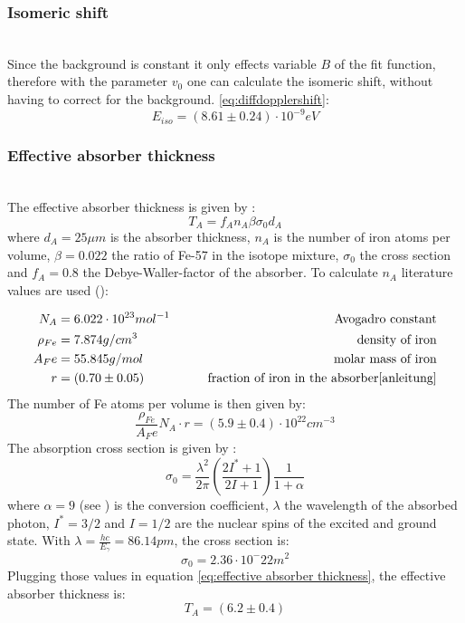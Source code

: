 \subsubsection{Isomeric shift} \ \\
Since the background is constant it only effects variable $B$ of the fit function, therefore
with the parameter $v_0$ one can calculate the isomeric shift, without having to correct for the background. \ref{eq:diffdopplershift}:
\begin{equation}
E_{iso} = (8.61\pm0.24)\cdot 10^{-9} eV
\end{equation}
\subsubsection{Effective absorber thickness}
\label{sec:effab}
 \ \\
The effective absorber thickness is given by \cite{anleitung}:
\begin{equation}
T_A = f_An_A\beta\sigma_0d_A
\label{eq:effective absorber thickness}
\end{equation}
where $d_A = 25\mu m$ is the absorber thickness, $n_A$ is the number of iron atoms per volume, $\beta=0.022$ the ratio of Fe-57 in the isotope mixture, $\sigma_0$ the cross section and $f_A=0.8$ the Debye-Waller-factor of the absorber.
To calculate $n_A$ literature values are used (\cite{webelements}):

\begin{equation*}
\begin{aligned}
N_A &= 6.022 \cdot 10^{23} mol^{-1} \qquad& \text{Avogadro constant}\\
\rho_{Fe} &= 7.874 g/cm^3 \qquad& \text{density of iron} \\
A_Fe &= 55.845 g/mol \qquad& \text{molar mass of iron}\\
r &=  (0.70\pm0.05) \qquad& \text{fraction of iron in the absorber\cite{anleitung}}
\end{aligned}
\end{equation*}
The number of Fe atoms per volume is then given by:
\begin{equation*}
\frac{\rho_{Fe}}{A_Fe}N_A\cdot r= (5.9\pm0.4)\cdot 10^{22} cm^{-3}
\end{equation*}
The absorption cross section is given by \cite{Wegener}:
\begin{equation}
\sigma_0= \frac{\lambda^2}{2\pi} \left(\frac{2I^*+1}{2I+1}\right) \frac{1}{1+\alpha}
\end{equation}
where $\alpha =9$ (see \cite{Wegener}) is the conversion coefficient, $\lambda$ the wavelength of the absorbed photon, $I^*=3/2$ and $I=1/2$  are the nuclear spins of the excited and ground state. With $\lambda = \frac{hc}{E_\gamma}=86.14 pm$, the cross section is:
\begin{equation}
\sigma_0=2.36\cdot 10^-22m^2
\end{equation}
Plugging those values in equation \ref{eq:effective absorber thickness}, the effective absorber thickness is:
\begin{equation}
T_A = (6.2\pm 0.4)
\end{equation}
